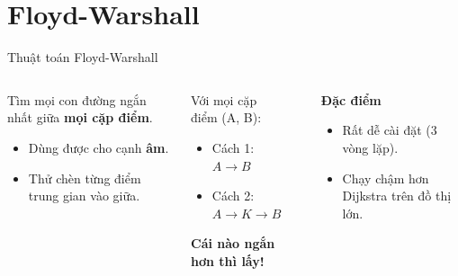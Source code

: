 \documentclass{beamer}
\begin{document}
\section{Floyd-Warshall}
\begin{frame}{Thuật toán Floyd-Warshall}

\begin{columns}

\begin{tcolorbox}[title=\faMap \ Ý tưởng]
Tìm mọi con đường ngắn nhất giữa \textbf{mọi cặp điểm}.
\begin{itemize}
    \item[\faCheck] Dùng được cho cạnh \textbf{âm}.
    \item[\faRedo] Thử chèn từng điểm trung gian vào giữa.
\end{itemize}
\end{tcolorbox}

\vspace{0.2cm}

\begin{tcolorbox}[colframe=main2, title=\faQuestion \ So sánh]
Với mọi cặp điểm (A, B):
\begin{itemize}
    \item[\faArrowRight] Cách 1: $A \to B$
    \item[\faArrowRight] Cách 2: $A \to K \to B$
\end{itemize}
\textbf{Cái nào ngắn hơn thì lấy!}
\end{tcolorbox}

\begin{center}
\end{center}

\begin{tcolorbox}
\textbf{\faInfoCircle Đặc điểm}
\begin{itemize}
    \item Rất dễ cài đặt (3 vòng lặp).
    \item Chạy chậm hơn Dijkstra trên đồ thị lớn.
\end{itemize}
\end{tcolorbox}

\end{columns}
\end{frame}
\end{document}
